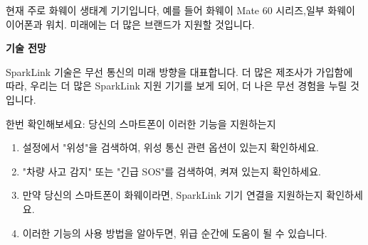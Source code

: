 
현재 주로 화웨이 생태계 기기입니다, 예를 들어 화웨이 Mate 60 시리즈,일부 화웨이 이어폰과 워치. 미래에는 더 많은 브랜드가 지원할 것입니다.

\textbf{기술 전망}\par

SparkLink 기술은 무선 통신의 미래 방향을 대표합니다. 더 많은 제조사가 가입함에 따라, 우리는 더 많은 SparkLink 지원 기기를 보게 되어, 더 나은 무선 경험을 누릴 것입니다.

\begin{tcbpractice}{한번 확인해보세요: 당신의 스마트폰이 이러한 기능을 지원하는지}
\begin{enumerate}
  \item 설정에서 "위성"을 검색하여, 위성 통신 관련 옵션이 있는지 확인하세요.
  \item "차량 사고 감지" 또는 "긴급 SOS"를 검색하여, 켜져 있는지 확인하세요.
  \item 만약 당신의 스마트폰이 화웨이라면, SparkLink 기기 연결을 지원하는지 확인하세요.
  \item 이러한 기능의 사용 방법을 알아두면, 위급 순간에 도움이 될 수 있습니다.
\end{enumerate}

\end{tcbpractice}
